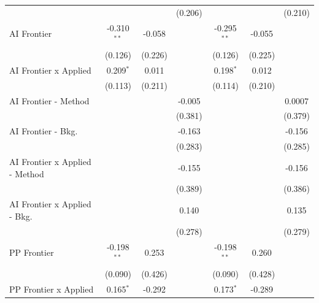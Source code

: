 \begin{tabular}{lcccccc}
                                  &                &                & (0.206)        &                &                & (0.210)\\   
   AI Frontier                    & -0.310$^{**}$  & -0.058         &                & -0.295$^{**}$  & -0.055         &   \\   
                                  & (0.126)        & (0.226)        &                & (0.126)        & (0.225)        &   \\   
   AI Frontier x Applied          & 0.209$^{*}$    & 0.011          &                & 0.198$^{*}$    & 0.012          &   \\   
                                  & (0.113)        & (0.211)        &                & (0.114)        & (0.210)        &   \\   
   AI Frontier - Method           &                &                & -0.005         &                &                & 0.0007\\   
                                  &                &                & (0.381)        &                &                & (0.379)\\   
   AI Frontier - Bkg.             &                &                & -0.163         &                &                & -0.156\\   
                                  &                &                & (0.283)        &                &                & (0.285)\\   
   AI Frontier x Applied - Method &                &                & -0.155         &                &                & -0.156\\   
                                  &                &                & (0.389)        &                &                & (0.386)\\   
   AI Frontier x Applied - Bkg.   &                &                & 0.140          &                &                & 0.135\\   
                                  &                &                & (0.278)        &                &                & (0.279)\\   
   PP Frontier                    & -0.198$^{**}$  & 0.253          &                & -0.198$^{**}$  & 0.260          &   \\   
                                  & (0.090)        & (0.426)        &                & (0.090)        & (0.428)        &   \\   
   PP Frontier x Applied          & 0.165$^{*}$    & -0.292         &                & 0.173$^{*}$    & -0.289         &   \\   

\end{tabular}
